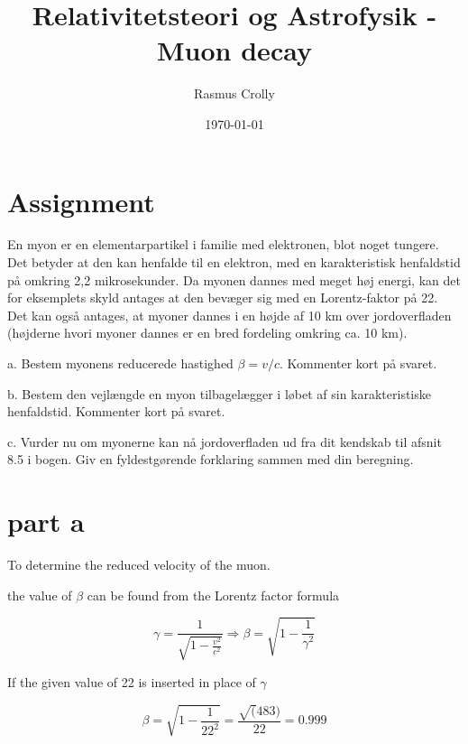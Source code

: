 \documentclass[12pt,a4paper]{article}
\title{Relativitetsteori og Astrofysik - Muon decay}
\author{Rasmus Crolly}
\date{\today}
\begin{document}
\maketitle
\section{Assignment}
En myon er en elementarpartikel i familie med elektronen, blot noget tungere. Det betyder at den kan henfalde til en elektron, med en karakteristisk henfaldstid på omkring 2,2 mikrosekunder. Da myonen dannes med meget høj energi, kan det for eksemplets skyld antages at den bevæger sig med en Lorentz-faktor på 22. Det kan også antages, at myoner dannes i en højde af 10 km over jordoverfladen (højderne hvori myoner dannes er en bred fordeling omkring ca. 10 km).

a.      Bestem myonens reducerede hastighed \begin{math}
\beta=v/c
\end{math}. Kommenter kort på svaret.

b.      Bestem den vejlængde en myon tilbagelægger i løbet af sin karakteristiske henfaldstid. Kommenter kort på svaret.

c.      Vurder nu om myonerne kan nå jordoverfladen ud fra dit kendskab til afsnit 8.5 i bogen. Giv en fyldestgørende forklaring sammen med din beregning.


\section{part a}

To determine the reduced velocity of the muon.

the value of \begin{math}
\beta
\end{math} can be found from the Lorentz factor formula

\begin{equation} \label{}
\gamma=\frac{1}{\sqrt{1-\frac{v^2}{c^2}}}\Rightarrow \beta=\sqrt{1-\frac{1}{\gamma^2}} 
\end{equation} 

If the given value of 22 is inserted in place of \begin{math}
\gamma
\end{math} 

\begin{equation} \label{}
\beta=\sqrt{1-\frac{1}{22^2}}=\frac{\sqrt(483)}{22}=0.999
\end{equation}
\end{document}
